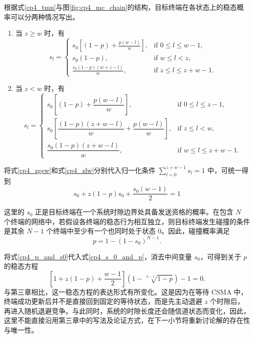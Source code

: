 根据式\eqref{cp4_tmn}与图\ref{fig:cp4_mc_chain}的结构，目标终端在各状态上的稳态概率可以分两种情况写出。
\begin{enumerate}[wide]
    \item 当 $z\ge w$ 时，有
    \begin{equation}\label{cp4_zgew}
        s_l =
\begin{cases}
s_0 \left[ (1 - p) + \frac{p(w-l)}{w} \right], & \text{if } 0 \le l \le w - 1, \\
s_0 (1 - p), & \text{if } w \le l < z, \\
\frac{s_0 (1-p)(w+z-l)}{w}, & \text{if } z \le l \le z + w - 1.
\end{cases}
    \end{equation}

    \item 当 $z<w$ 时，有
    \begin{equation}\label{cp4_zlw}
        s_l =
\begin{cases}
s_0 \left[ (1 - p) + \dfrac{p(w-l)}{w} \right], & \text{if } 0 \le l \le z - 1, \\
s_0 \left[ \dfrac{(1-p)(z+w-l)}{w} + \dfrac{p(w-l)}{w} \right], & \text{if } z \le l < w, \\
\dfrac{s_0 (1-p)(z+w-l)}{w}, & \text{if } w \le l \le z + w - 1.
\end{cases}
    \end{equation}
\end{enumerate}

将式\eqref{cp4_zgew}和式\eqref{cp4_zlw}分别代入归一化条件 $\sum_{l=0}^{z+w-1}s_l=1$ 中，可统一得到
\begin{equation}\label{cp4_s_0_and_p}
    s_0+z(1-p)s_0+\frac{s_0(w-1)}{2}=1
\end{equation}

这里的 $s_0$ 正是目标终端在一个系统时隙边界处具备发送资格的概率。在包含 $N$ 个终端的网络中，若假设各终端的稳态行为相互独立，则目标终端发生碰撞的条件是其余 $N-1$ 个终端中至少有一个也同时处于状态 0。因此，碰撞概率满足
\begin{equation}\label{cp4_p_and_s0}
    p=1-(1-s_0)^{N-1}.
\end{equation}

将式\eqref{cp4_p_and_s0}代入式\eqref{cp4_s_0_and_p}，消去中间变量 $s_0$，可得到关于 $p$ 的稳态方程
\begin{equation}\label{cp4_ziqiafangcheng_p}
    \left[ 1 + z(1-p) + \frac{w-1}{2} \right] \left( 1 -\sqrt[N -1]{1-p} \right) - 1=0.
\end{equation}
与第三章相比，这一稳态方程的表达形式有所变化。这是因为在等待 CSMA 中，终端成功更新后并不是直接回到固定的等待状态，而是先主动退避 $z$ 个时隙后，再进入随机退避竞争。与此同时，系统的时隙长度还会随信道状态而变化，因此，这里不能直接沿用第三章中的写法及论证方式，在下一小节将重新讨论解的存在性与唯一性。

